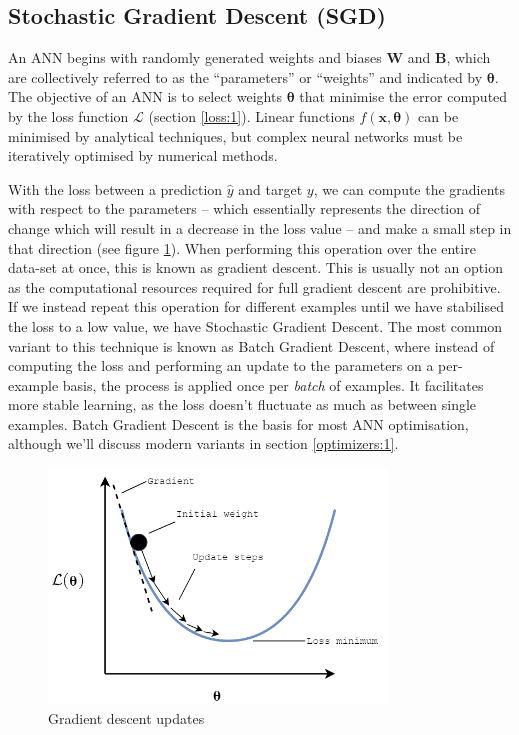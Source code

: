 \documentclass{report}
\begin{document}
\subsection{Stochastic Gradient Descent (SGD)} \label{sgd:1}
An ANN begins with randomly generated weights and biases $\bm{W}$ and $\bm{B}$, which are collectively referred to as the ``parameters'' or ``weights'' and indicated by $\bm{\theta}$. The objective of an ANN is to select weights $\bm{\theta}$ that minimise the error computed by the loss function $\mathcal{L}$ (section \ref{loss:1}). Linear functions $f(\bm{x}, \bm{\theta})$ can be minimised by analytical techniques, but complex neural networks must be iteratively optimised by numerical methods. \par
With the loss between a prediction $\hat{y}$ and target $y$, we can compute the gradients with respect to the parameters -- which essentially represents the direction of change which will result in a decrease in the loss value -- and make a small step in that direction (see figure \ref{fig:grad-descent:1}). When performing this operation over the entire data-set at once, this is known as gradient descent. This is usually not an option as the computational resources required for full gradient descent are prohibitive. If we instead repeat this operation for different examples until we have stabilised the loss to a low value, we have Stochastic Gradient Descent. The most common variant to this technique is known as Batch Gradient Descent, where instead of computing the loss and performing an update to the parameters on a per-example basis, the process is applied once per \textit{batch} of examples. It facilitates more stable learning, as the loss doesn't fluctuate as much as between single examples. Batch Gradient Descent is the basis for most ANN optimisation, although we'll discuss modern variants in section \ref{optimizers:1}. \par
\begin{figure}[h]
 \centering
 \includegraphics[width=9cm]{graddescent}
 \caption{Gradient descent updates}
 \label{fig:grad-descent:1}
\end{figure}
\end{document}
